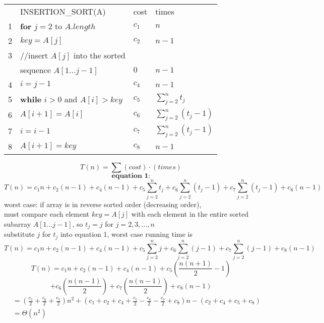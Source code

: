 \documentclass[12pt,border=4pt,multi]{article}%
\begin{document}
\begin{table}[htb]
    \begin{tabular}{llll} %
    & INSERTION\_SORT(A) & cost & times\\ 
    1 & \textbf{for} $j = 2$ to $A.length$ & $c_1$ & $n$\\
    2 & \quad $key = A[j]$ & $c_2$ & $n - 1$\\
    3 & \quad //insert $A[j]$ into the sorted\\
      & \quad \; sequence $A[1...j - 1]$ & $0$ & $n - 1$\\
    4 & \quad $i = j - 1$ & $c_4$ & $n - 1$\\
    5 & \quad \textbf{while} $i > 0$ and $A[i] > key$ & $c_5$ & $\sum_{j=2}^{n} t_j$\\
    6 &  \qquad\; $A[i + 1] = A[i]$ & $c_6$ & $\sum_{j=2}^{n} (t_j - 1)$\\
    7 &  \qquad\; $i = i - 1$ & $c_7$ & $\sum_{j=2}^{n} (t_j - 1)$\\
    8 &  \quad $A[i + 1] = key$ & $c_8$ & $n - 1$\\
    \end{tabular}
\end{table}
\[T(n) = \sum (cost)\cdot(times)\]
\[\textbf{equation 1:}\]
\[
T(n) = c_1 n + c_2 (n - 1) + c_4 (n - 1) + c_5 \sum_{j=2}^{n} t_j + c_6 \sum_{j=2}^{n} (t_j - 1) + c_7 \sum_{j=2}^{n} (t_j - 1) + c_8 (n - 1)
\]
worst case: if array is in reverse sorted order (decreasing order),\\
must compare each element $key = A[j]$ with each element in the entire sorted subarray $A[1...j - 1]$, so $t_j = j$ for $j = 2, 3, ..., n$\\ 
substitute $j$ for $t_j$ into equation 1, worst case running time is
\[T(n) = c_1 n + c_2 (n - 1) + c_4 (n - 1) + c_5 \sum_{j=2}^{n} j + c_6 \sum_{j=2}^{n} (j - 1) + c_7 \sum_{j=2}^{n} (j - 1) + c_8 (n - 1)\]
\[T(n) = c_1 n + c_2 (n - 1) + c_4 (n - 1) + c_5 \left( \frac{n(n + 1)}{2} - 1 \right) \]
\[+ c_6 \left( \frac{n(n - 1)}{2} \right) + c_7 \left( \frac{n(n - 1)}{2} \right) + c_8 (n - 1)\]
\begin{align*}
&= \left( \frac{c_5}{2} + \frac{c_6}{2} + \frac{c_7}{2}\right) n^2 + \left(c_1 + c_2 + c_4 + \frac{c_5}{2} - \frac{c_6}{2} - \frac{c_7}{2} + c_8\right) n
- (c_2 + c_4 + c_5 + c_8)\\
&= \Theta(n^2)\\
\end{align*}
\\
\\
\end{document}
